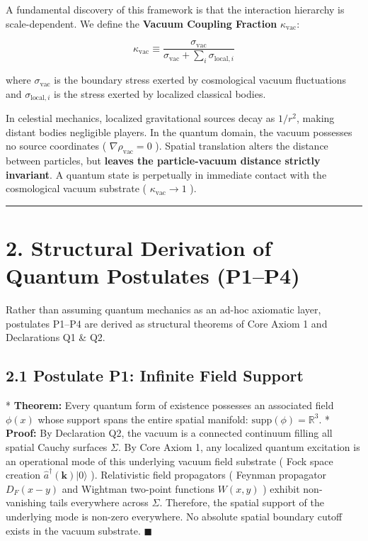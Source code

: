 \documentclass[11pt,a4paper]{article}
\theoremstyle{definition}\newtheorem{definition}{Definition}
\theoremstyle{remark}\newtheorem{remark}{Remark}
\begin{document}
A fundamental discovery of this framework is that the interaction hierarchy is scale-dependent. We define the \textbf{Vacuum Coupling Fraction} $\kappa_{\text{vac}}$:


\begin{equation}
\kappa_{\text{vac}} \equiv \frac{\sigma_{\text{vac}}}{\sigma_{\text{vac}} + \sum_i \sigma_{\text{local}, i}}
\end{equation}


where $\sigma_{\text{vac}}$ is the boundary stress exerted by cosmological vacuum fluctuations and $\sigma_{\text{local}, i}$ is the stress exerted by localized classical bodies.

In celestial mechanics, localized gravitational sources decay as $1/r^2$, making distant bodies negligible players. In the quantum domain, the vacuum possesses no source coordinates ( $\nabla \rho_{\text{vac}} = 0$ ). Spatial translation alters the distance between particles, but \textbf{leaves the particle-vacuum distance strictly invariant}. A quantum state is perpetually in immediate contact with the cosmological vacuum substrate ( $\kappa_{\text{vac}} \to 1$ ).

\noindent\rule{\linewidth}{0.4pt}
\section{2. Structural Derivation of Quantum Postulates (P1–P4)}

Rather than assuming quantum mechanics as an ad-hoc axiomatic layer, postulates P1–P4 are derived as structural theorems of Core Axiom 1 and Declarations Q1 \& Q2.
\subsection{2.1 Postulate P1: Infinite Field Support}

* \textbf{Theorem:} Every quantum form of existence possesses an associated field $\phi(x)$ whose support spans the entire spatial manifold: $\text{supp}(\phi) = \mathbb{R}^3$.
* \textbf{Proof:} By Declaration Q2, the vacuum is a connected continuum filling all spatial Cauchy surfaces $\Sigma$. By Core Axiom 1, any localized quantum excitation is an operational mode of this underlying vacuum field substrate ( Fock space creation $\hat{a}^\dagger(\mathbf{k})|0\rangle$ ). Relativistic field propagators ( Feynman propagator $D_F(x-y)$ and Wightman two-point functions $W(x, y)$ ) exhibit non-vanishing tails everywhere across $\Sigma$. Therefore, the spatial support of the underlying mode is non-zero everywhere. No absolute spatial boundary cutoff exists in the vacuum substrate. $\blacksquare$
\end{document}
